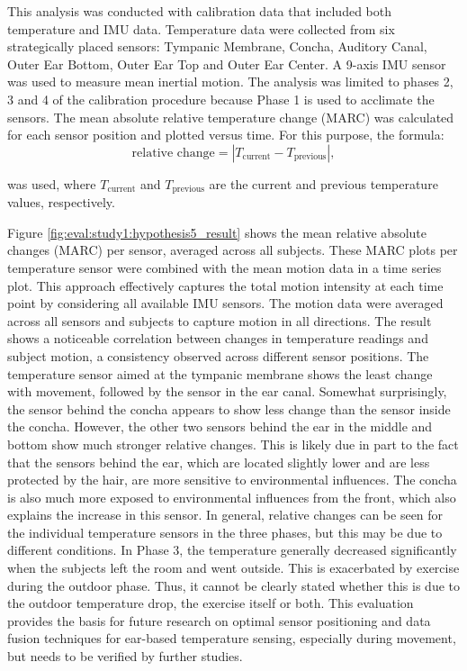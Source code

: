 This analysis was conducted with calibration data that included both temperature and IMU data. 
Temperature data were collected from six strategically placed sensors: Tympanic Membrane, Concha, Auditory Canal, Outer Ear Bottom, Outer Ear Top and Outer Ear Center.
A 9-axis IMU sensor was used to measure mean inertial motion. 
The analysis was limited to phases 2, 3 and 4 of the calibration procedure because Phase 1 is used to acclimate the sensors.
The mean absolute relative temperature change (MARC) was calculated for each sensor position and plotted versus time.
For this purpose, the formula:
\[
\text{relative change} = \left| T_{\text{current}} - T_{\text{previous}} \right|,
\]

was used, where \( T_{\text{current}} \) and \( T_{\text{previous}} \) are the current and previous temperature values, respectively. 

Figure \ref{fig:eval:study1:hypothesis5_result} shows the mean relative absolute changes (MARC) per sensor, averaged across all subjects.
These MARC plots per temperature sensor were combined with the mean motion data in a time series plot.
This approach effectively captures the total motion intensity at each time point by considering all available IMU sensors.
The motion data were averaged across all sensors and subjects to capture motion in all directions.
The result shows a noticeable correlation between changes in temperature readings and subject motion, a consistency observed across different sensor positions.
The temperature sensor aimed at the tympanic membrane shows the least change with movement, followed by the sensor in the ear canal.
Somewhat surprisingly, the sensor behind the concha appears to show less change than the sensor inside the concha. 
However, the other two sensors behind the ear in the middle and bottom show much stronger relative changes. 
This is likely due in part to the fact that the sensors behind the ear, which are located slightly lower and are less protected by the hair, are more sensitive to environmental influences. 
The concha is also much more exposed to environmental influences from the front, which also explains the increase in this sensor.
In general, relative changes can be seen for the individual temperature sensors in the three phases, but this may be due to different conditions. 
In Phase 3, the temperature generally decreased significantly when the subjects left the room and went outside.
This is exacerbated by exercise during the outdoor phase. 
Thus, it cannot be clearly stated whether this is due to the outdoor temperature drop, the exercise itself or both.
This evaluation provides the basis for future research on optimal sensor positioning and data fusion techniques for ear-based temperature sensing, especially during movement, but needs to be verified by further studies.

